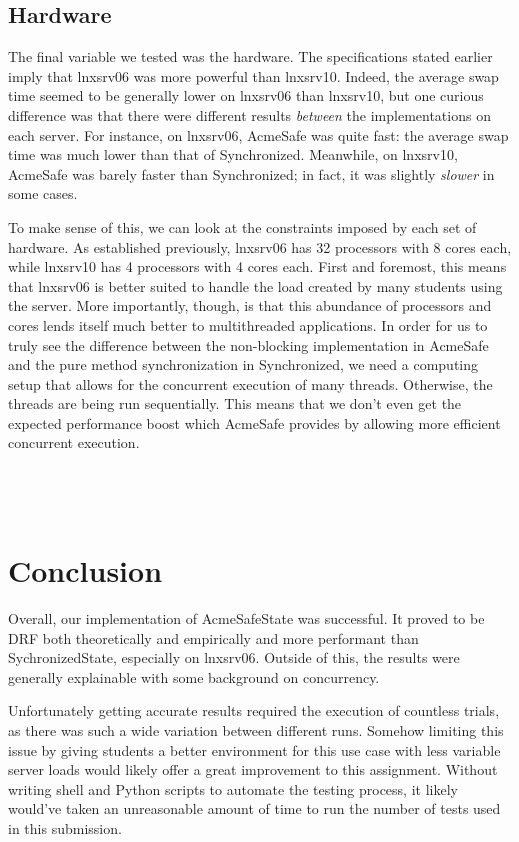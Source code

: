 \subsection{Hardware}

The final variable we tested was the hardware. The specifications stated earlier imply that lnxsrv06 was more powerful than lnxsrv10. Indeed, the average 
swap time seemed to be generally lower on lnxsrv06 than lnxsrv10, but one curious difference was that there were different results \emph{between} the implementations
on each server. For instance, on lnxsrv06, AcmeSafe was quite fast: the average swap time was much lower than that of Synchronized. Meanwhile, on lnxsrv10, AcmeSafe was barely faster than Synchronized; in fact, it was slightly \emph{slower} in some cases.

To make sense of this, we can look at the constraints imposed by each set of hardware. As established previously, lnxsrv06 has 32 processors with 8 cores each, while lnxsrv10 has 4 processors
with 4 cores each. First and foremost, this means that lnxsrv06 is better suited to handle the load created by many students using the server. More importantly, though, is that this 
abundance of processors and cores lends itself much better to multithreaded applications. In order for us to truly see the difference between the non-blocking implementation in 
AcmeSafe and the pure method synchronization in Synchronized, we need a computing setup that allows for the concurrent execution of many threads. Otherwise, the threads
are being run sequentially. This means that we don't even get the expected performance boost which AcmeSafe provides by allowing more efficient concurrent execution.
\\
\\
\\
\\
\section{Conclusion}
Overall, our implementation of AcmeSafeState was successful. It proved to be DRF both theoretically and empirically and more performant than SychronizedState, especially on 
lnxsrv06. Outside of this, the results were generally explainable with some background on concurrency.

Unfortunately getting accurate results required the execution of countless trials, as there was such a wide variation between different runs. Somehow limiting this issue by giving students
a better environment for this use case with less variable server loads would likely offer a great improvement to this assignment. Without writing
shell and Python scripts to automate the testing process, it likely would've taken an unreasonable amount of time to run the number of tests used in 
this submission.

